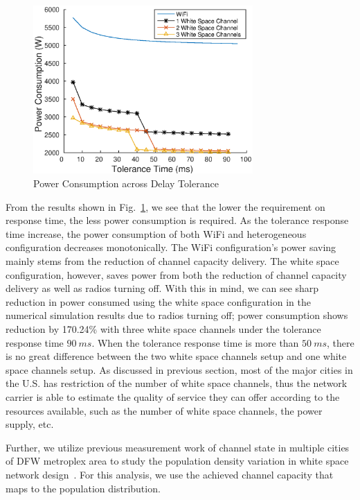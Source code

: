 \begin{figure}[hpt]
\vspace{-0.0in}
\centering
\includegraphics[width=84mm]{figures/delay_vary}
\vspace{-0.1in}
\caption{Power Consumption across Delay Tolerance}
\label{fig:delayvary}
\vspace{-0.1in}
\end{figure}

From the results shown in Fig.~\ref{fig:delayvary}, we see that the lower the requirement on response time, the less power consumption is required.
As the tolerance response time increase, the power consumption of both WiFi and heterogeneous configuration decreases monotonically. 
The WiFi configuration's power saving mainly stems from the reduction of channel capacity delivery. 
The white space configuration, however, saves power from both the reduction of channel capacity delivery as well as radios turning off. 
With this in mind, we can see sharp reduction in power consumed using the white space configuration in the numerical simulation results due to radios turning off; power consumption shows reduction by 170.24\% with three white space channels under the tolerance response time $90\ ms$.
When the tolerance response time is more than $50\ ms$, there is no great difference between the two white space channels setup and one white space channels setup. 
As discussed in previous section, most of the major cities in the U.S. has restriction of the number of white space channels, thus the network carrier is able to estimate the quality of service they can offer according to the resources available, such as the number of white space channels, the power supply, etc.


Further, we utilize previous measurement work of channel state in multiple cities of DFW metroplex area to study the population density variation in white space network design~\cite{pcuiwinmee}.
For this analysis, we use the achieved channel capacity that maps to the population distribution. 

